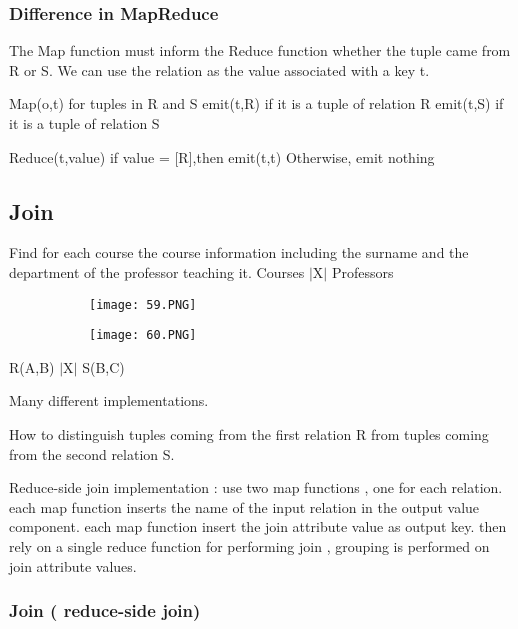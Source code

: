\documentclass{article}
\begin{document}
\subsubsection{Difference in MapReduce}
The Map function must inform the Reduce function whether the tuple came from R or S. We can use the relation as the value associated with a key t.

Map(o,t) for tuples in R and S
    emit(t,R) if it is a tuple of relation R
    emit(t,S) if it is a tuple of relation S

Reduce(t,value)
if value = [R],then emit(t,t)
Otherwise, emit nothing

\vspace{10mm}

\subsection{Join}

Find for each course the course information including the surname and the department of the professor teaching it. Courses $|$X$|$ Professors

\begin{figure}[ht!]
  \centering
  \begin{subfigure}[b]{0.5\linewidth}
    \texttt{[image: 59.PNG]}
  \end{subfigure}
     \begin{subfigure}[b]{0.4\textwidth}
         \centering
         \texttt{[image: 60.PNG]}
     \end{subfigure}
\end{figure}


R(A,B) $|$X$|$ S(B,C)

Many different implementations.

How to distinguish tuples coming from the first relation R from tuples coming from the second relation S.

Reduce-side join implementation : 
use two map functions , one for each relation.
each map function inserts the name of the input relation in the output value component.
each map function insert the join attribute value as output key.
then rely on a single reduce function for performing join , grouping is performed on join attribute values.

\vspace{50mm}

\subsubsection{Join ( reduce-side join)}
\end{document}
